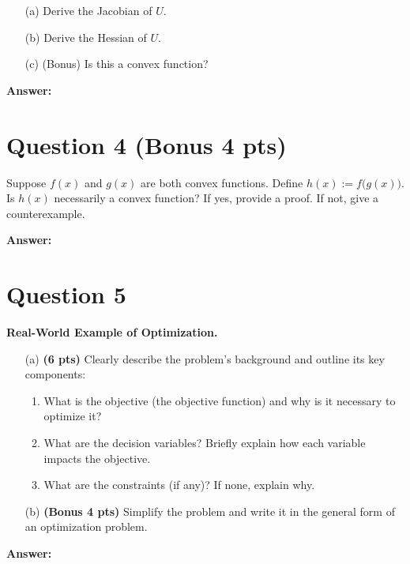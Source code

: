 \documentclass[12pt]{article}
\begin{document}
\begin{enumerate}
    \item[(a)] Derive the Jacobian of \(U\).
    \item[(b)] Derive the Hessian of \(U\).
    \item[(c)] (Bonus) Is this a convex function?
\end{enumerate}

\noindent \textbf{Answer:}
\vspace{3cm}

\newpage

\section*{Question 4 (Bonus 4 pts)}
Suppose \(f(x)\) and \(g(x)\) are both convex functions. Define \(h(x) := f\bigl(g(x)\bigr)\). Is \(h(x)\) necessarily a convex function? If yes, provide a proof. If not, give a counterexample.

\noindent \textbf{Answer:}
\vspace{3cm}

\newpage

\section*{Question 5}
\textbf{Real-World Example of Optimization.}

\begin{enumerate}
    \item[(a)] \textbf{(6 pts)} Clearly describe the problem's background and outline its key components:
    \begin{enumerate}
        \item What is the objective (the objective function) and why is it necessary to optimize it?
        \item What are the decision variables? Briefly explain how each variable impacts the objective.
        \item What are the constraints (if any)? If none, explain why.
    \end{enumerate}
    \item[(b)] \textbf{(Bonus 4 pts)} Simplify the problem and write it in the general form of an optimization problem.
\end{enumerate}

\noindent \textbf{Answer:}
\vspace{3cm}
\end{document}
